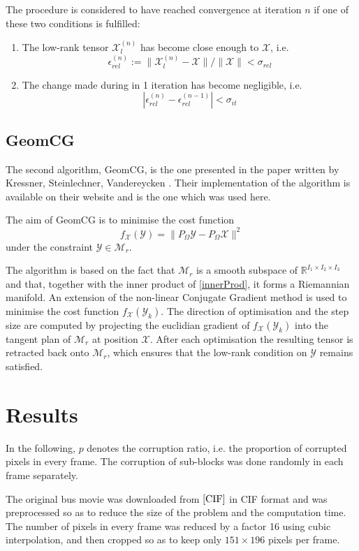 \documentclass[a4paper, 11pt]{article} %
\def \be {\begin{equation*}}
\def \ee {\end{equation*}}
\def \X {\mathcal{X}}
\def \R {\mathbb{R}}
\def \t {\times}
\def \Y {\mathcal{Y}}
\def \Mr {\mathcal{M}_{r}}
\def \Xl {\mathcal{X}_{l}}
\begin{document}
The procedure is considered to have reached convergence at iteration $n$ if one of these two conditions is fulfilled:
\begin{enumerate}
\item The low-rank tensor $\Xl^{(n)}$ has become close enough to $\X$, i.e.
\be
 \epsilon_{rel}^{(n)}:=\|\Xl^{(n)}-\X \|/\| \X\|<\sigma_{rel}
\ee
\item The change made during in 1 iteration has become negligible, i.e. 
\be
|\epsilon_{rel}^{(n)}-\epsilon_{rel}^{(n-1)}|<\sigma_{it}
\ee
\end{enumerate}

\subsection{GeomCG}
The second algorithm, GeomCG, is the one presented in the paper written by Kressner, Steinlechner, Vandereycken \cite{GeomCG}. Their implementation of the algorithm is available on their website \cite{SiteANCHP} and is the one which was used here.

The aim of GeomCG is to minimise the cost function
\be
f_{\X}(\Y)=\| P_{\Omega}\Y-P_{\Omega}\X\|^2
\ee
under the constraint $\Y \in \Mr$.

The algorithm is based on the fact that $\Mr$  is a smooth subspace of $\R^{I_1\t I_2 \t I_3}$ and that, together with the inner product of \autoref{innerProd}, it forms a Riemannian manifold.
An extension of the non-linear Conjugate Gradient method is used to minimise the cost function $f_{\X}(\Y_k)$. The direction of optimisation and the step size are computed by projecting the euclidian gradient of $f_{\X}(\Y_k)$ into the tangent plan of $\Mr$ at position $\X$. After each optimisation the resulting tensor is retracted back onto $\Mr$, which ensures that the low-rank condition on $\Y$ remains satisfied.
\section{Results}
In the following, $p$ denotes the corruption ratio, i.e. the proportion of corrupted pixels in every frame. The corruption of sub-blocks was done randomly in each frame separately.

The original bus movie was downloaded from $\cite{CIF}$ in CIF format and was preprocessed so as to reduce the size of the problem and the computation time. The number of pixels in every frame was reduced by a factor 16 using cubic interpolation, and then cropped so as to keep only $151\t 196$ pixels per frame.
\end{document}
